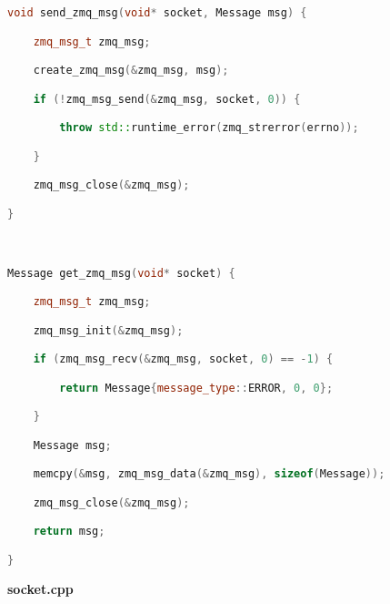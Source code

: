 \begin{lstlisting}[language=C++]
void send_zmq_msg(void* socket, Message msg) {

    zmq_msg_t zmq_msg;

    create_zmq_msg(&zmq_msg, msg);

    if (!zmq_msg_send(&zmq_msg, socket, 0)) {

        throw std::runtime_error(zmq_strerror(errno));

    }

    zmq_msg_close(&zmq_msg);

}



Message get_zmq_msg(void* socket) {

    zmq_msg_t zmq_msg;

    zmq_msg_init(&zmq_msg);

    if (zmq_msg_recv(&zmq_msg, socket, 0) == -1) {

        return Message{message_type::ERROR, 0, 0};

    }

    Message msg;

    memcpy(&msg, zmq_msg_data(&zmq_msg), sizeof(Message));

    zmq_msg_close(&zmq_msg);

    return msg;

}

\end{lstlisting}

\textbf{socket.cpp}


